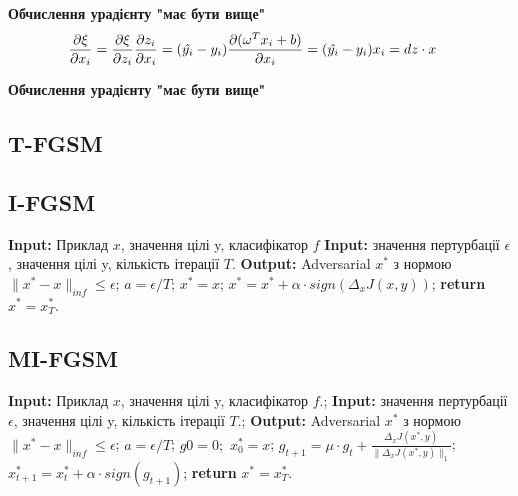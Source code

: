 \documentclass[a4paper,14pt]{extreport}
\renewcommand{\algorithmicrequire}{\textbf{Input: }}
\renewcommand{\algorithmicensure}{\textbf{Output: }}
\newcommand{\algorithmreturn}{\textbf{return }}
\newcommand{\tran}{^{T}}
\begin{document}
	\textbf{Обчислення урадієнту "має бути вище"}
	\begin{align*}
		\pdv{\xi}{x_i} 
		&=
		\pdv{\xi}{z_i} \pdv{z_i}{x_i} 
		=
		(\hat{y_i} - y_i) \pdv{(\omega\tran x_i+ b)}{x_i} 
		=
		(\hat{y_i} - y_i) x_i 
		=
		dz \cdot x
	\end{align*}
	
	\textbf{Обчислення урадієнту "має бути вище"}
	

	\subsection{T-FGSM}

	\subsection{I-FGSM}
		\begin{algorithm}
			\caption{$I-FGSM$}
			\begin{algorithmic}[1]
				\State \algorithmicrequire{Приклад $x$, значення цілі y, класифікатор $f$}
				\State \algorithmicrequire{значення пертурбації $\epsilon$, значення цілі y, кількість ітерації $T$.}
				\State \algorithmicensure{ Adversarial $x^{*}$ з нормою $\|x^{*} - x\|_{inf} \leq \epsilon $;}
				\State $a = \epsilon / T $;
				\State $x^{*} = x$;
				\State $x^{*} = x^{*} + \alpha \cdot sign(\Delta_x J(x, y))$;
				\EndFor
				\State \algorithmreturn{$x^{*} = x^{*}_{T}$}.
			\end{algorithmic}
		\end{algorithm}
		

	\subsection{MI-FGSM}
	\begin{algorithm}
	\caption{$MI-FGSM$}
		\begin{algorithmic}[1]
			\State \algorithmicrequire{Приклад $x$, значення цілі y, класифікатор $f$.};
			\State \algorithmicrequire{значення пертурбації $\epsilon$, значення цілі y, кількість ітерації $T$.};
			\State \algorithmicensure{ Adversarial $x^{*}$ з нормою $\|x^{*} - x\|_{inf} \leq \epsilon $};
			\State $a = \epsilon / T$;
			\State $g0 = 0;$ $x^{*}_0 = x$;
			\For{$t=0 \quad to \quad T-1$}
			\State $g_{t+1} = \mu \cdot g_t + \frac{\Delta_x J(x^{*}, y)}{\|\Delta_x J(x^{*}, y)\|_1}$;
			\State $x^{*}_{t+1} = x^{*}_{t} + \alpha \cdot sign(g_{t+1})$;
			\EndFor
			\State \algorithmreturn{$x^{*} = x^{*}_{T}$}.
		\end{algorithmic}
	\end{algorithm}
	
\end{document}
